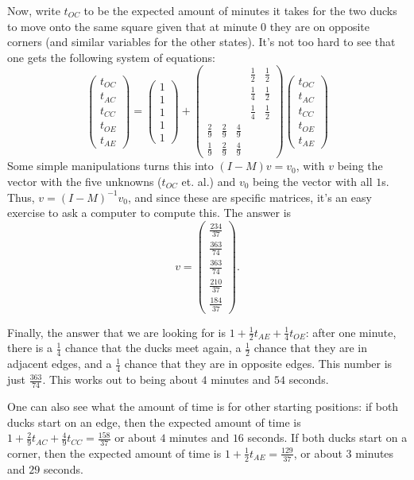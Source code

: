 \documentclass[11pt]{article}
\theoremstyle{definition}
\begin{document}
Now, write $t_{OC}$ to be the expected amount of minutes it takes for the two ducks to move onto the same square given that at minute $0$ they are on opposite corners (and similar variables for the other states).  It's not too hard to see that one gets the following system of equations:
$$\left(\begin{matrix} t_{OC} \\ t_{AC} \\ t_{CC} \\ t_{OE} \\ t_{AE} \end{matrix}\right) = \left(\begin{matrix} 1 \\ 1\\ 1\\ 1\\ 1\end{matrix}\right) + \left(\begin{matrix}  &  &  & \frac{1}{2} & \frac{1}{2} \\  &  &  & \frac{1}{4} & \frac{1}{2} \\  &  &  & \frac{1}{4} & \frac{1}{2} \\ \frac{2}{9} & \frac{2}{9} & \frac{4}{9} &  &  \\ \frac{1}{9} & \frac{2}{9} & \frac{4}{9} &  &  \end{matrix}\right)\left(\begin{matrix} t_{OC} \\ t_{AC} \\ t_{CC} \\ t_{OE} \\ t_{AE} \end{matrix}\right)$$
Some simple manipulations turns this into $(I-M)v = v_0$, with $v$ being the vector with the five unknowns ($t_{OC}$ et. al.) and $v_0$ being the vector with all $1$s.  Thus, $v = (I-M)^{-1}v_0$, and since these are specific matrices, it's an easy exercise to ask a computer to compute this.  The answer is $$v = \left(\begin{matrix} \frac{234}{37} \\ \frac{363}{74} \\ \frac{363}{74} \\ \frac{210}{37} \\ \frac{184}{37}\end{matrix} \right).$$

Finally, the answer that we are looking for is $1 + \frac{1}{2} t_{AE} + \frac{1}{4} t_{OE}$: after one minute, there is a $\frac{1}{4}$ chance that the ducks meet again, a $\frac{1}{2}$ chance that they are in adjacent edges, and a $\frac{1}{4}$ chance that they are in opposite edges.  This number is just $\frac{363}{74}$.  This works out to being about $4$ minutes and $54$ seconds.

One can also see what the amount of time is for other starting positions: if both ducks start on an edge, then the expected amount of time is $1 + \frac{2}{9}t_{AC} + \frac{4}{9}t_{CC} = \frac{158}{37}$ or about $4$ minutes and $16$ seconds.  If both ducks start on a corner, then the expected amount of time is $1 + \frac{1}{2}t_{AE} = \frac{129}{37}$, or about $3$ minutes and $29$ seconds.
\end{document}
